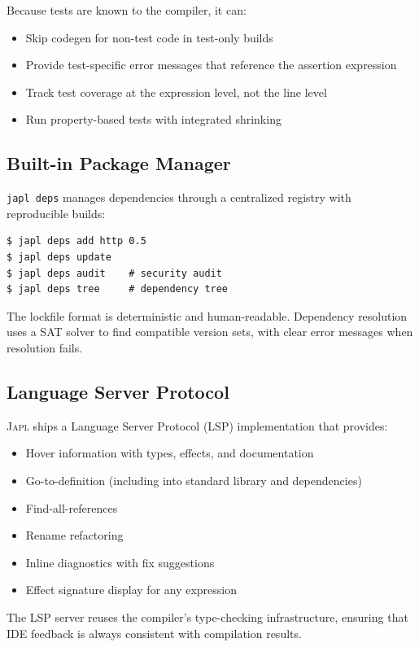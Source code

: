 \documentclass[11pt,twocolumn]{article}
\newcommand{\japl}{\textsc{Japl}}
\begin{document}
Because tests are known to the compiler, it can:
\begin{itemize}[leftmargin=*]
\item Skip codegen for non-test code in test-only builds
\item Provide test-specific error messages that reference the assertion expression
\item Track test coverage at the expression level, not the line level
\item Run property-based tests with integrated shrinking
\end{itemize}

\subsection{Built-in Package Manager}

\texttt{japl deps} manages dependencies through a centralized registry with reproducible builds:

\begin{lstlisting}[language=shell]
$ japl deps add http 0.5
$ japl deps update
$ japl deps audit    # security audit
$ japl deps tree     # dependency tree
\end{lstlisting}

The lockfile format is deterministic and human-readable.
Dependency resolution uses a SAT solver to find compatible version sets, with clear error messages when resolution fails.

\subsection{Language Server Protocol}

\japl{} ships a Language Server Protocol (LSP) implementation that provides:
\begin{itemize}[leftmargin=*]
\item Hover information with types, effects, and documentation
\item Go-to-definition (including into standard library and dependencies)
\item Find-all-references
\item Rename refactoring
\item Inline diagnostics with fix suggestions
\item Effect signature display for any expression
\end{itemize}

The LSP server reuses the compiler's type-checking infrastructure, ensuring that IDE feedback is always consistent with compilation results.
\end{document}
